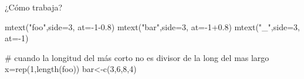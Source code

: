 \documentclass[
  ignorenonframetext,
  aspectratio=169,
  spanish,
]{beamer}
\newenvironment{Shaded}{\begin{snugshade}}{\end{snugshade}}
\newcommand{\AttributeTok}[1]{\textcolor[rgb]{0.40,0.45,0.13}{#1}}
\newcommand{\CommentTok}[1]{\textcolor[rgb]{0.37,0.37,0.37}{#1}}
\newcommand{\DecValTok}[1]{\textcolor[rgb]{0.68,0.00,0.00}{#1}}
\newcommand{\FloatTok}[1]{\textcolor[rgb]{0.68,0.00,0.00}{#1}}
\newcommand{\FunctionTok}[1]{\textcolor[rgb]{0.28,0.35,0.67}{#1}}
\newcommand{\NormalTok}[1]{\textcolor[rgb]{0.00,0.23,0.31}{#1}}
\newcommand{\OtherTok}[1]{\textcolor[rgb]{0.00,0.23,0.31}{#1}}
\newcommand{\SpecialCharTok}[1]{\textcolor[rgb]{0.37,0.37,0.37}{#1}}
\newcommand{\StringTok}[1]{\textcolor[rgb]{0.13,0.47,0.30}{#1}}
\begin{document}
\begin{frame}[fragile]{¿Cómo trabaja?}
\begin{Shaded}
\begin{Highlighting}[]
\FunctionTok{mtext}\NormalTok{(}\StringTok{"foo"}\NormalTok{,}\AttributeTok{side=}\DecValTok{3}\NormalTok{, }\AttributeTok{at=}\SpecialCharTok{{-}}\DecValTok{1}\FloatTok{{-}0.8}\NormalTok{)}
\FunctionTok{mtext}\NormalTok{(}\StringTok{"bar"}\NormalTok{,}\AttributeTok{side=}\DecValTok{3}\NormalTok{, }\AttributeTok{at=}\SpecialCharTok{{-}}\DecValTok{1}\FloatTok{+0.8}\NormalTok{)}
\FunctionTok{mtext}\NormalTok{(}\StringTok{"\_"}\NormalTok{,}\AttributeTok{side=}\DecValTok{3}\NormalTok{, }\AttributeTok{at=}\SpecialCharTok{{-}}\DecValTok{1}\NormalTok{)}

\CommentTok{\# cuando la longitud del más corto no es divisor de la long del mas largo}
\NormalTok{x}\OtherTok{=}\FunctionTok{rep}\NormalTok{(}\DecValTok{1}\NormalTok{,}\FunctionTok{length}\NormalTok{(foo))}
\NormalTok{bar}\OtherTok{\textless{}{-}}\FunctionTok{c}\NormalTok{(}\DecValTok{3}\NormalTok{,}\DecValTok{6}\NormalTok{,}\DecValTok{8}\NormalTok{,}\DecValTok{4}\NormalTok{)}


\end{Highlighting}
\end{Shaded}
\end{frame}
\end{document}
